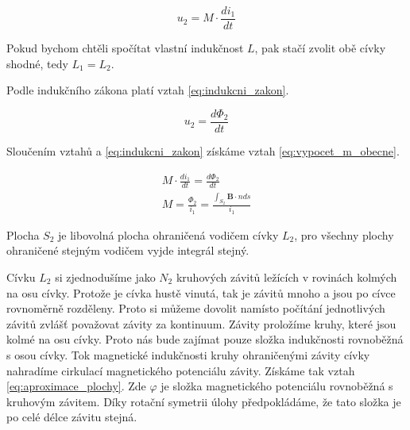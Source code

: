 \documentclass{book}
\newcommand{\vect}[1]{\boldsymbol{#1}}
\begin{document}
\begin{equation}
\label{eq:definice_m}
u_2 = M \cdot \frac{di_1}{dt}
\end{equation}

Pokud bychom chtěli spočítat vlastní indukčnost \(L\), pak stačí zvolit obě cívky shodné, tedy \(L_1 = L_2\).



Podle indukčního zákona platí vztah \eqref{eq:indukcni_zakon}.

\begin{equation}
\label{eq:indukcni_zakon}
u_2 = \frac{d\Phi_2}{dt}
\end{equation}

Sloučením vztahů \label{eq:definice_m} a \eqref{eq:indukcni_zakon} získáme vztah \eqref{eq:vypocet_m_obecne}.

\begin{equation}
\label{eq:vypocet_m_obecne}
\begin{split}
M \cdot \frac{di_1}{dt} = \frac{d\Phi_2}{dt} \\
M = \frac{\Phi_2}{i_1} = \frac{\int_{S_2} \vect{B} \cdot {n} ds}{i_1}
\end{split}
\end{equation}

Plocha \(S_2\) je libovolná plocha ohraničená vodičem cívky \(L_2\), pro všechny plochy ohraničené stejným vodičem vyjde integrál stejný.

Cívku \(L_2\) si zjednodušíme jako \(N_2\) kruhových závitů ležících v rovinách kolmých na osu cívky. Protože je cívka hustě vinutá, tak je závitů mnoho a jsou po cívce rovnoměrně rozděleny. Proto si můžeme dovolit namísto počítání jednotlivých závitů zvlášť považovat závity za kontinuum. Závity proložíme kruhy, které jsou kolmé na osu cívky. Proto nás bude zajímat pouze složka indukčnosti rovnoběžná s osou cívky. Tok magnetické indukčnosti kruhy ohraničenými závity cívky nahradíme cirkulací magnetického potenciálu závity. Získáme tak vztah \eqref{eq:aproximace_plochy}. Zde \(\varphi\) je složka magnetického potenciálu rovnoběžná s kruhovým závitem. Díky rotační symetrii úlohy předpokládáme, že tato složka je po celé délce závitu stejná.
\end{document}
